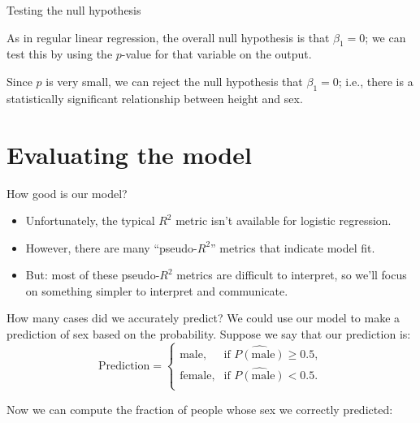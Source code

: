 \documentclass{beamer}\usepackage[]{graphicx}\usepackage[]{color}
\begin{document}
\begin{darkframes}
    \begin{frame}{Testing the null hypothesis}
      \begin{center}
        As in regular linear regression, the overall null hypothesis is that $\beta_1=0$; we can test this by using the $p$-value for that variable on the output.

        \bigskip\pause
        Since $p$ is very small, we can reject the null hypothesis that $\beta_1=0$; i.e., there is a statistically significant relationship between height and sex.
      \end{center}
    \end{frame}

    \section{Evaluating the model}

    \begin{frame}{How good is our model?}
      \begin{itemize}[<+->]
        \item Unfortunately, the typical $R^2$ metric isn't available for logistic regression.
        \item However, there are many ``pseudo-$R^2$'' metrics that indicate model fit.
        \item But: most of these pseudo-$R^2$ metrics are difficult to interpret, so we'll focus on something simpler to interpret and communicate.
      \end{itemize}
    \end{frame}

    \begin{frame}[fragile]{How many cases did we accurately predict?}
      We could use our model to make a prediction of sex based on the probability. Suppose we say that our prediction is:
      \[
        \text{Prediction} = \begin{cases}
          \text{male}, & \text{if $\widehat{P(\text{male})} \geq 0.5$}, \\
          \text{female}, & \text{if $\widehat{P(\text{male})} < 0.5$}. \\
        \end{cases}
      \]

      \pause
      Now we can compute the fraction of people whose sex we correctly predicted:


\end{frame}
\end{darkframes}
\end{document}
